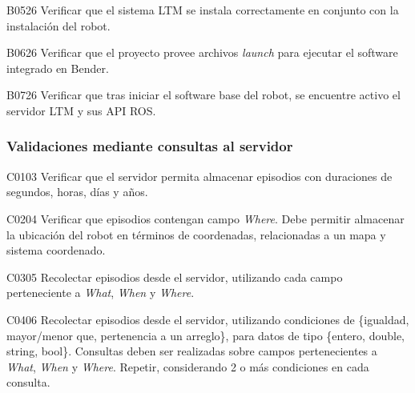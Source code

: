 \begin{def-validacion}{B}{05}{26}
Verificar que el sistema LTM se instala correctamente en conjunto con la instalación del robot.	
\end{def-validacion}

\begin{def-validacion}{B}{06}{26}
	Verificar que el proyecto provee archivos \textit{launch} para ejecutar el software integrado en Bender.
\end{def-validacion}

\begin{def-validacion}{B}{07}{26}
Verificar que tras iniciar el software base del robot, se encuentre activo el servidor LTM y sus API ROS.
\end{def-validacion}


\subsubsection{Validaciones mediante consultas al servidor}

\begin{def-validacion}{C}{01}{03}
	Verificar que el servidor permita almacenar episodios con duraciones de segundos, horas, días y años.	
\end{def-validacion}

\begin{def-validacion}{C}{02}{04}
	Verificar que episodios contengan campo \textit{Where}. Debe permitir almacenar la ubicación del robot en términos de coordenadas, relacionadas a un mapa y sistema coordenado.
\end{def-validacion}

\begin{def-validacion}{C}{03}{05}
	Recolectar episodios desde el servidor, utilizando cada campo perteneciente a \textit{What}, \textit{When} y \textit{Where}.
\end{def-validacion}

\begin{def-validacion}{C}{04}{06}
	Recolectar episodios desde el servidor, utilizando condiciones de \{igualdad, mayor/menor que, pertenencia a un arreglo\}, para datos de tipo \{entero, double, string, bool\}. Consultas deben ser realizadas sobre campos pertenecientes a \textit{What}, \textit{When} y \textit{Where}. Repetir, considerando 2 o más condiciones en cada consulta.
\end{def-validacion}

